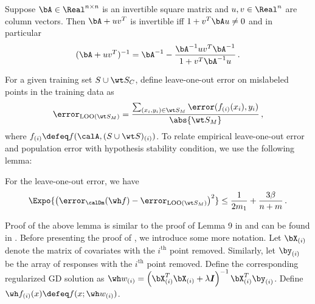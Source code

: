 \begin{lemma} \label{lem:sherman}
    Suppose $\bA \in \Real^{n \times n}$ 
    is an invertible square matrix 
    and $u,v \in \Real^n$ are column vectors. 
    Then $\bA + uv^T$ is invertible iff $1 + v^T \bA u \ne 0$ 
    and in particular
    \begin{align}
        (\bA + u v^T)^{-1} = \bA^{-1}  - \frac{\bA^{-1} uv^T \bA^{-1} }{ 1 + v^T \bA^{-1} u} \,.
    \end{align}   
\end{lemma}
\newcommand\byy[1]{\by_{\left(#1\right)}}
\newcommand\bXX[1]{\bX_{\left(#1\right)}}
\newcommand\ff[1]{\wh f_{\left(#1\right)}}

For a given training set $S \cup \wt S_C$, 
define leave-one-out error 
on mislabeled points in the training data 
as $$\error_{\text{LOO}(\wt S_M) } = \frac{\sum_{(x_i, y_i) \in \wt S_M} \error( f_{(i)}( x_i), y_i)}{ \abs{\wt S_M }} \,, $$
where $f_{(i)} \defeq f(\calA, (S \cup \wt S)_{(i)})$. 
To relate empirical leave-one-out error and population error 
with hypothesis stability condition, 
we use the following lemma:   

\begin{lemma} \label{lem:stability_error}
    For the leave-one-out error, we have
    \begin{align}
        \Expo{ \left( \error_{\calDm}(\wh f) -\error_{\text{LOO}(\wt S_M) } \right)^2 } \le \frac{1}{2m_1}+  \frac{3\beta}{n + m}\,.
    \end{align}   
\end{lemma}

Proof of the above lemma is similar 
to the proof of Lemma 9 in \citet{bousquet2002stability} 
and can be found in . 
% 
Before presenting the proof of , 
we introduce some more notation. 
Let $\bX_{(i)}$ denote the matrix of covariates 
with the $i^{\text{th}}$ point removed. 
Similarly, let $\by_{(i)}$ be the array of responses 
with the $i^{\text{th}}$ point removed. 
Define the corresponding regularized GD solution 
as $\wh w_{(i)} = \left( \bXX{i}^T\bXX{i}+\lambda \boldsymbol{I}\right)^{-1}\bXX{i}^T\byy{i}$. 
Define $\ff{i}(x) \defeq f(x ; \wh w_{(i)}) $.

